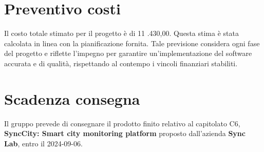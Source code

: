 \documentclass[8pt]{article}
\begin{document}
\section{Preventivo costi}
Il costo totale stimato per il progetto è di 11 .430,00\;\texteuro. Questa stima è stata calcolata in linea con la pianificazione fornita. Tale previsione considera ogni fase del progetto e riflette l'impegno per garantire un'implementazione del software accurata e di qualità, rispettando al contempo i vincoli finanziari stabiliti. 
\section{Scadenza consegna}
Il gruppo prevede di consegnare il prodotto finito relativo al capitolato C6, \textbf{SyncCity: Smart city monitoring platform} proposto dall'azienda \textbf{Sync Lab}, entro il 2024-09-06.
\end{document}
